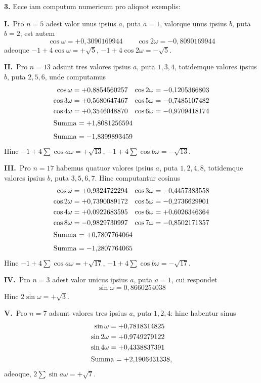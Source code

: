 \documentclass[12pt,a4paper]{article}
\theoremstyle{plain}
\begin{document}
\medskip
\noindent\textbf{3.} Ecce iam computum numericum pro aliquot exemplis:

\medskip
\noindent\textbf{I.}\ Pro $n = 5$ adest valor unus ipsius $a$, puta $a = 1$, valorque unus ipsius $b$, puta $b = 2$; est autem
\[
\cos \omega = +0{,}3090169944 \qquad \cos 2\omega = -0{,}8090169944
\]
adeoque $-1 + 4\cos \omega = +\sqrt{5}$, $-1 + 4\cos 2\omega = -\sqrt{5}$.

\medskip
\noindent\textbf{II.}\ Pro $n = 13$ adsunt tres valores ipsius $a$, puta $1, 3, 4$, totidemque valores ipsius $b$, puta $2, 5, 6$, unde computamus
\begin{align*}
\cos \omega &= +0{,}8854560257 & \cos 2\omega &= -0{,}1205366803\\
\cos 3\omega &= +0{,}5680647467 & \cos 5\omega &= -0{,}7485107482\\
\cos 4\omega &= +0{,}3546048870 & \cos 6\omega &= -0{,}9709418174\\
\intertext{Summa $= +1{,}8081256594$} \intertext{Summa $= -1{,}8399893459$}
\end{align*}
Hinc $-1 + 4\sum \cos a\omega = +\sqrt{13}$, $-1 + 4\sum \cos b\omega = -\sqrt{13}$.

\medskip
\noindent\textbf{III.}\ Pro $n = 17$ habemus quatuor valores ipsius $a$, puta $1, 2, 4, 8$, totidemque valores ipsius $b$, puta $3, 5, 6, 7$. Hinc computantur cosinus
\begin{align*}
\cos \omega &= +0{,}9324722294 & \cos 3\omega &= -0{,}4457383558\\
\cos 2\omega &= +0{,}7390089172 & \cos 5\omega &= -0{,}2736629901\\
\cos 4\omega &= +0{,}0922683595 & \cos 6\omega &= +0{,}6026346364\\
\cos 8\omega &= -0{,}9829730997 & \cos 7\omega &= -0{,}8502171357\\
\intertext{Summa $= +0{,}7807764064$} \intertext{Summa $= -1{,}2807764065$}
\end{align*}
Hinc $-1 + 4\sum \cos a\omega = +\sqrt{17}$, $-1 + 4\sum \cos b\omega = -\sqrt{17}$.

\medskip
\noindent\textbf{IV.}\ Pro $n = 3$ adest valor unicus ipsius $a$, puta $a = 1$, cui respondet
\[
\sin \omega = 0{,}8660254038
\]
Hinc $2\sin \omega = +\sqrt{3}$.

\medskip
\noindent\textbf{V.}\ Pro $n = 7$ adsunt valores tres ipsius $a$, puta $1, 2, 4$: hinc habentur sinus
\begin{align*}
\sin \omega &= +0{,}7818314825\\
\sin 2\omega &= +0{,}9749279122\\
\sin 4\omega &= +0{,}4338837391\\
\intertext{Summa $= +2{,}1906431338$,}
\end{align*}
adeoque, $2\sum \sin a\omega = +\sqrt{7}$.
\end{document}
